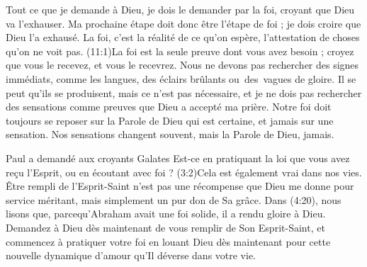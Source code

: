 Tout ce que je demande à Dieu, je dois le demander par la foi,
 croyant que Dieu va l'exhauser. Ma prochaine étape doit donc être
 l'étape de foi ; je dois croire que Dieu l'a exhausé.
 La foi, c'est la réalité de ce qu'on espère,
 l'attestation de choses qu'on ne voit pas.
 (11:1)La foi est la seule preuve dont vous avez besoin ;
 croyez que vous le recevez, et vous le recevrez.
 Nous ne devons pas rechercher des signes immédiats, comme les langues,
 des éclairs brûlants ou~des~vagues de gloire.
 Il se peut qu'ils se produisent, mais ce n'est pas nécessaire,
 et je ne dois pas rechercher des sensations comme preuves
 que Dieu a accepté ma prière. Notre foi doit toujours se reposer
 sur la Parole de Dieu qui est certaine, et jamais sur une sensation.
 Nos sensations changent souvent, mais la Parole de Dieu, jamais.

Paul a demandé aux croyants Galates\frcolon{}
 \Og Est-ce en pratiquant la loi que vous avez reçu l'Esprit,
 ou en écoutant avec foi ? \Fg{}
 (3:2)Cela est également vrai dans nos vies.
 Être rempli de l'Esprit-Saint n'est pas une récompense que Dieu
 me donne pour service méritant, mais simplement un pur don de Sa grâce.
 Dans (4:20), nous lisons que, parcequ'Abraham avait
 une foi solide, il a rendu gloire à Dieu.
 Demandez à Dieu dès maintenant de vous remplir de Son Esprit-Saint,
 et commencez à pratiquer votre foi en louant Dieu dès maintenant
 pour cette nouvelle dynamique d'amour qu'Il déverse dans votre vie.
\closechapter

